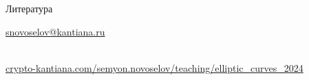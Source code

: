 \documentclass{beamer}
\begin{document}

\begin{frame}{Литература}
    \nocite{CohenFrey+2005}
    \nocite{Washington2008}
    \printbibliography
    
    \begin{center}
        \begin{tcolorbox}[enhanced,hbox,colback=block-green-color-bg,colframe=subsection-color!120,title=Контакты,center title]
            \begin{varwidth}{\textwidth}
                \begin{center}
                    \href{mailto:snovoselov@kantiana.ru}{snovoselov@kantiana.ru}
                \end{center}
            \end{varwidth}
        \end{tcolorbox}	
    \end{center}

\\
{\footnotesize
    \href{https://crypto-kantiana.com/semyon.novoselov/teaching/elliptic_curves_2024}{crypto-kantiana.com/semyon.novoselov/teaching/elliptic\_curves\_2024}
}
\end{frame}
\end{document}
